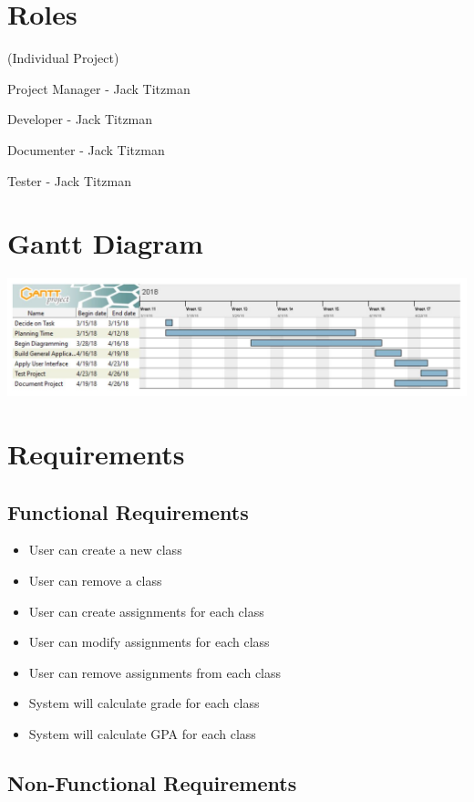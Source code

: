 \documentclass[12pt]{article}
\begin{document}
\newpage

\section*{Roles}

(Individual Project)

Project Manager - Jack Titzman

Developer - Jack Titzman

Documenter - Jack Titzman

Tester - Jack Titzman

\newpage

\section*{Gantt Diagram}

\includegraphics[width=\textwidth]{GanttDiagram}

\newpage

\section*{Requirements}

\subsection*{Functional Requirements}

\begin{itemize}
	\item User can create a new class
	\item User can remove a class
	\item User can create assignments for each class
	\item User can modify assignments for each class
	\item User can remove assignments from each class
	\item System will calculate grade for each class
	\item System will calculate GPA for each class
\end{itemize}

\subsection*{Non-Functional Requirements}
\end{document}
